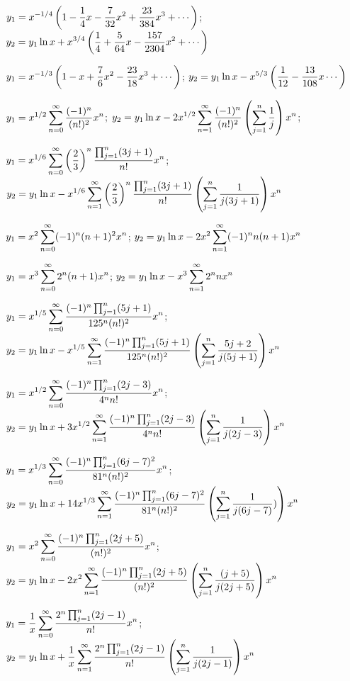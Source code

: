 $\displaystyle{y_1=x^{-1/4}\left(1-\frac{1}{4}x-\frac{7}{32}x^2+\frac{23}{384}x^3
+\cdots\right)}$;\;
$\displaystyle{y_2=
y_1\ln x+x^{3/4}\left(\frac{1}{4}+\frac{5}{64}x-\frac{157}{2304}x^2
+\cdots\right)}$

$\displaystyle{y_1=x^{-1/3}\left(1-x+\frac{7}{6}x^2-\frac{23}{18}x^3+\cdots\right)}$;\;
$\displaystyle{y_2=
y_1\ln x-x^{5/3}\left(\frac{1}{12}-\frac{13}{108}x\cdots\right)}$

$\displaystyle{y_1=x^{1/2}\sum_{n=0}^\infty\frac{(-1)^n}{(n!)^2}x^n}$;\;
$\displaystyle{y_2=y_1\ln x-2x^{1/2}\sum_{n=1}^\infty
\frac{(-1)^n}{(n!)^2}\left(\sum_{j=1}^n\frac{1}{j}\right)x^n}$;\;

$\displaystyle{y_1=x^{1/6}\sum_{n=0}^\infty\left(\frac23\right)^n
\frac{\prod_{j=1}^n(3j+1)}{ n!}x^n}$;\;
$\displaystyle{y_2=y_1\ln x-x^{1/6}\sum_{n=1}^\infty
\left(\frac23\right)^n
\frac{\prod_{j=1}^n(3j+1)}{n!}\left(\sum_{j=1}^n\frac{1}{j(3j+1)}\right)x^n}$

$\displaystyle{y_1=x^2\sum_{n=0}^\infty} (-1)^n(n+1)^2x^n$;\;
$\displaystyle{y_2=y_1\ln
x-2x^2\sum_{n=1}^\infty(-1)^nn(n+1)x^n}$

$\displaystyle{y_1=x^3\sum_{n=0}^\infty 2^n(n+1)x^n}$;\;
$\displaystyle{y_2=
y_1\ln x-x^3\sum_{n=1}^\infty2^nnx^n}$

$\displaystyle{y_1=x^{1/5}\sum_{n=0}^\infty\frac{(-1)^n\prod_{j=1}^n(5j+1)}{125^n(n!)^2} x^n}$;\;
$\displaystyle{y_2=
y_1\ln
x-x^{1/5}\sum_{n=1}^\infty\frac{(-1)^n\prod_{j=1}^n(5j+1)}{125^n(n!)^2}
\left(\sum_{j=1}^n\frac{5j+2}{j(5j+1)}\right)x^n}$

$\displaystyle{y_1=x^{1/2}\sum_{n=0}^\infty\frac{(-1)^n\prod_{j=1}^n(2j-3)}{4^nn!}
x^n}$;\;
$\displaystyle{y_2=y_1\ln x+3x^{1/2}\sum_{n=1}^\infty
\frac{(-1)^n\prod_{j=1}^n(2j-3)}{4^nn!}\left(\sum_{j=1}^n\frac{1}{j(2j-3)}\right)x^n}$

$\displaystyle{y_1=x^{1/3}\sum_{n=0}^\infty\frac{(-1)^n\prod_{j=1}^n(6j-7)^2}{81^n(n!)^2}
x^n}$;\;
$\displaystyle{y_2=y_1\ln
x+14x^{1/3}\sum_{n=1}^\infty\frac{(-1)^n\prod_{j=1}^n(6j-7)^2}{81^n(n!)^2}\left(\sum_{j=1}^n\frac{1}{j(6j-7)})\right)x^n}$

$\displaystyle{y_1=x^2\sum_{n=0}^\infty\frac{(-1)^n\prod_{j=1}^n(2j+5)}{(n!)^2}
x^n}$;\;
$\displaystyle{y_2=
y_1\ln x-2x^2\sum_{n=1}^\infty\frac{(-1)^n\prod_{j=1}^n(2j+5)}{(n!)^2}
\left(\sum_{j=1}^n\frac{(j+ 5)}{j(2j+ 5)}\right)x^n}$

$\displaystyle{y_1=\frac{1}{x}\sum_{n=0}^\infty\frac{2^n\prod_{j=1}^n(2j-1)}{n!}
x^n}$;\;
$\displaystyle{y_2=y_1\ln
x+\frac{1}{x}\sum_{n=1}^\infty\frac{2^n\prod_{j=1}^n(2j-1)}{n!}
\left(\sum_{j=1}^n\frac{1}{j(2j-1)}\right)x^n}$

